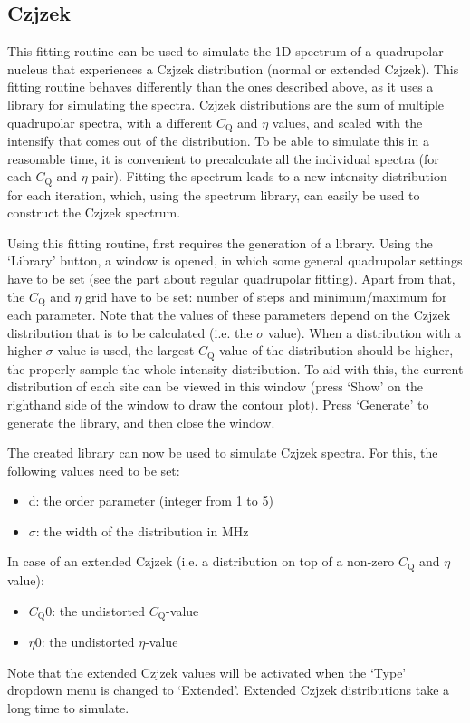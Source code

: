 \documentclass[11pt,a4paper]{article}
\begin{document}
\subsection{Czjzek}
This fitting routine can be used to simulate the 1D spectrum of a quadrupolar nucleus that
experiences a Czjzek distribution (normal or extended Czjzek). This fitting routine behaves
differently than the ones described above, as it uses a library for simulating the spectra. Czjzek
distributions are the sum of multiple quadrupolar spectra, with a different $C_\text{Q}$ and $\eta$
values, and scaled with the intensify that comes out of the distribution. To be able to simulate
this in a reasonable time, it is convenient to precalculate all the individual spectra (for each
$C_\text{Q}$ and $\eta$ pair). Fitting the spectrum leads to a new intensity distribution for each
iteration, which, using the spectrum library, can easily be used to construct the Czjzek spectrum.

Using this fitting routine, first requires the generation of a library. Using the `Library'
button, a window is opened, in which some general quadrupolar settings have to be set (see the part
about regular quadrupolar fitting). Apart from that, the $C_\text{Q}$ and $\eta$ grid have to be
set: number of steps and minimum/maximum for each parameter. Note that the values of these parameters
depend on the Czjzek distribution that is to be calculated (i.e. the $\sigma$ value). When a
distribution with a higher $\sigma$ value is used, the largest $C_\text{Q}$ value of the distribution
should be higher, the properly sample the whole intensity distribution. To aid with this, the
current distribution of each site can be viewed in this window (press `Show' on the righthand side
of the window to draw the contour plot). Press `Generate' to generate the library, and then close
the window.

The created library can now be used to simulate Czjzek spectra. For this, the following values need
to be set:

\begin{itemize}
\item d: the order parameter (integer from 1 to 5)
\item $\sigma$: the width of the distribution in MHz
\end{itemize}
In case of an extended Czjzek (i.e. a distribution on top of a non-zero $C_\text{Q}$ and $\eta$
value):
\begin{itemize}
  \item $C_\text{Q}0$: the undistorted $C_\text{Q}$-value
  \item $\eta0$: the undistorted $\eta$-value
\end{itemize}
Note that the extended Czjzek values will be activated when the `Type' dropdown menu is changed to
`Extended'. Extended Czjzek distributions take a long time to simulate. 
\end{document}
